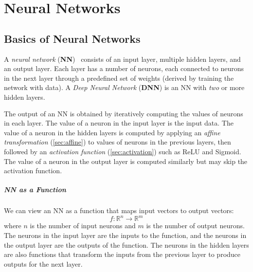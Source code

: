\documentclass[oneside,11pt,dvipsnames]{book}
\numberwithin{equation}{section}
\theoremstyle{definition}
\theoremstyle{remark}
\begin{document}
\chapter{Neural Networks}\label{chap:nn-basics}

\section{Basics of Neural Networks}
A \emph{neural network} (\textbf{NN})~\cite{Goodfellow-et-al-2016} consists of an input layer, multiple hidden layers, and an output layer. Each layer has a number of neurons, each connected to neurons in the next layer through a predefined set of weights (derived by training the network with data). A \emph{Deep Neural Network} (\textbf{DNN}) is an NN with \emph{two} or more hidden layers. 


The output of an NN is obtained by iteratively computing  the  values  of  neurons  in  each  layer.
The value of a neuron in the input layer is the input data. 
The value of a neuron in the hidden layers is computed by applying an \emph{affine transformation} (\autoref{sec:affine}) to values of neurons in the previous layers, then followed by an \emph{activation function} (\autoref{sec:activation}) such as ReLU and Sigmoid. 
The value of a neuron in the output layer is computed similarly but may skip the activation function.

\paragraph{NN as a Function} We can view an NN as a function that maps input vectors to output vectors: 
\begin{equation}
f: \mathbb{R}^{n} \to \mathbb{R}^{m}
\end{equation}
where \(n\) is the number of input neurons and \(m\) is the number of output neurons. The neurons in the input layer are the inputs to the function, and the neurons in the output layer are the outputs of the function. The neurons in the hidden layers are also functions that transform the inputs from the previous layer to produce outputs for the next layer.
\end{document}
